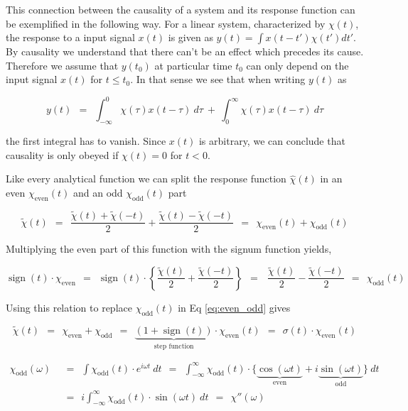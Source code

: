 \documentclass[10pt]{report}
\numberwithin{equation}{chapter}
\newcommand{\refEq}[1]{
  Eq  \ref{#1}
}
\DeclareMathOperator{\sign}{sign}
\begin{document}
This connection between the causality of a system and its response function can be exemplified in the following way.
For a linear system, characterized by $\chi(t)$, the response to a input signal $x(t)$ is given as $y(t) = \int x(t -t') \chi(t') dt'$. 
By causality we understand that there can't be an effect which precedes its cause. Therefore we assume that $y(t_0)$ at particular time $t_0$ can only depend on the input signal $x(t)$ for $t \leq t_0$. In that sense we see that when writing $y(t)$ as


\begin{equation}
  y(t) ~~=~~ \int_{-\infty}^0 \chi(\tau) x(t-\tau)\ d\tau ~+~ \int_0^\infty \chi(\tau) x(t-\tau)\ d\tau
\end{equation}

the first integral has to vanish. Since $x(t)$ is arbitrary, we can conclude that causality is only obeyed if $\chi(t)=0$ for $t<0$.

Like every analytical function we can split the response function $\hat{\chi}(t)$ in an even $\chi_\text{even}(t)$ and an odd $\chi_\text{odd}(t)$ part


\begin{equation} \label{eq:even_odd}
\tilde{\chi}(t) ~~ = ~~ \frac{\tilde{\chi}(t) + \tilde{\chi}(-t)}{2} + \frac{\tilde{\chi}(t) - \tilde{\chi}(-t)}{2} ~~ = ~~ \chi_\text{even}(t) + \chi_\text{odd}(t)
\end{equation}


Multiplying the even part of this function with the signum function yields,

\begin{equation}
  \sign(t) \cdot \chi_\text{even} ~~ = ~~ \sign(t) \cdot \left\{ \frac{\tilde{\chi}(t)}{2} + \frac{\tilde{\chi}(-t)}{2} \right\} ~~ = ~~~\frac{\tilde{\chi}(t)}{2} - \frac{\tilde{\chi}(-t)}{2} ~~ = ~~ \chi_\text{odd}(t)
\end{equation}


Using this relation to replace $\chi_\text{odd}(t)$ in \refEq{eq:even_odd} gives


\begin{equation}
\tilde{\chi}(t) ~~ = ~~ \chi_\text{even} + \chi_\text{odd} ~~ = ~~ \underbrace{(1 + \sign(t))}_\text{step function} \cdot \chi_\text{even}(t) ~~ = ~~ \sigma(t) \cdot \chi_\text{even}(t)
\end{equation}


\begin{align}
  \chi_\text{odd}(\omega) ~~& =~~ \int \chi_\text{odd}(t) \cdot e^{i\omega t}\ dt
  ~~=~~ \int_{-\infty}^\infty \chi_\text{odd}(t) \cdot
  \{ \underbrace{\cos(\omega t)}_\text{even} + i\underbrace{\sin(\omega t)}_\text{odd} \}\ dt \nonumber \\
  ~~& =~~ i \int_{-\infty}^{\infty} \chi_\text{odd}(t) \cdot \sin(\omega t)\ dt ~~=~~ \chi''(\omega)
\end{align}
\end{document}
